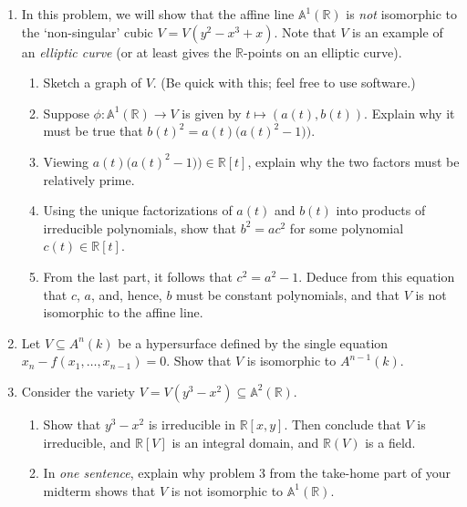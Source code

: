 \documentclass[11pt]{report}
\newcommand\RR{{\mathbb R}}
\newcommand\A{{\mathbb A}}
\begin{document}
\begin{enumerate}
\begin{enumerate}
\end{enumerate}

\item In this problem, we will show that the affine line $\A^1(\RR)$ is \emph{not}
isomorphic to the `non-singular' cubic $V = V(y^2 - x^3 + x)$. Note that $V$ is an example
of an \emph{elliptic curve} (or at least gives the $\RR$-points on an elliptic curve).

\begin{enumerate}

\item Sketch a graph of $V$.  (Be quick with this; feel free to use software.)

\item Suppose $\phi: \A^1(\RR) \to V$ is given by $t \mapsto (a(t), b(t))$.  Explain
why it must be true that ${b(t)}^2 = a(t)\big(a(t)^2 - 1) \big)$.

\item Viewing $a(t)\big(a(t)^2 - 1) \big) \in \RR[t]$, explain why the two factors must
be relatively prime.

\item Using the unique factorizations of $a(t)$ and $b(t)$ into products of irreducible
polynomials, show that $b^2 = ac^2$ for some polynomial $c(t) \in \RR[t]$.

\item From the last part, it follows that $c^2 = a^2 - 1$.  Deduce from this equation
that $c$, $a$, and, hence, $b$ must be constant polynomials, and that $V$
is not isomorphic to the affine line.

\end{enumerate}

\item Let $V \subseteq A^n(k)$ be a hypersurface defined by the single equation
$x_n - f(x_1, \dots, x_{n-1}) = 0$. Show that $V$ is isomorphic to $A^{n-1}(k)$.

\item Consider the variety $V = V(y^3 - x^2) \subseteq \A^2(\RR)$.  

\begin{enumerate}

\item Show that $y^3 - x^2$ is irreducible in $\RR[x,y]$.  Then conclude that
$V$ is irreducible, and $\RR[V]$ is an integral domain, and $\RR(V)$ is a field.

\item In \emph{one sentence}, explain why problem 3 from the take-home 
part of your midterm shows that $V$ is not isomorphic to $\A^1(\RR)$.


\end{enumerate}
\end{enumerate}
\end{document}
